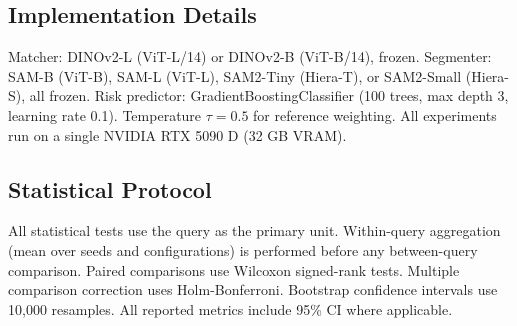\documentclass[11pt]{article}
\begin{document}
\subsection{Implementation Details}

Matcher: DINOv2-L (ViT-L/14) or DINOv2-B (ViT-B/14), frozen. Segmenter:
SAM-B (ViT-B), SAM-L (ViT-L), SAM2-Tiny (Hiera-T), or SAM2-Small (Hiera-S),
all frozen. Risk predictor: GradientBoostingClassifier (100 trees, max depth
3, learning rate 0.1). Temperature $\tau = 0.5$ for reference weighting. All
experiments run on a single NVIDIA RTX 5090 D (32 GB VRAM).

\subsection{Statistical Protocol}

All statistical tests use the query as the primary unit. Within-query
aggregation (mean over seeds and configurations) is performed before any
between-query comparison. Paired comparisons use Wilcoxon signed-rank tests.
Multiple comparison correction uses Holm-Bonferroni. Bootstrap confidence
intervals use 10,000 resamples. All reported metrics include 95\% CI where
applicable.

\end{document}
